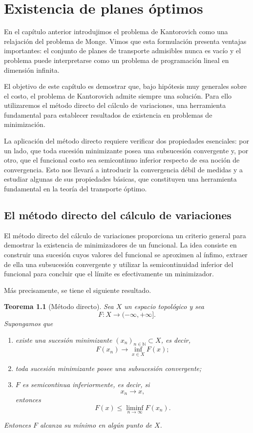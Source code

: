 \documentclass[12pt, a4paper]{amsbook}
\newtheorem{teo}{Teorema}[section]
\theoremstyle{remark}
\theoremstyle{definition}
\numberwithin{section}{chapter}
\numberwithin{subsection}{section}
\numberwithin{equation}{section}
\numberwithin{figure}{chapter}
\begin{document}
\chapter{Existencia de planes óptimos}\label{cap.existencia}

En el capítulo anterior introdujimos el problema de Kantorovich como una relajación del problema de Monge. Vimos que esta formulación presenta ventajas importantes: el conjunto de planes de transporte admisibles nunca es vacío y el problema puede interpretarse como un problema de programación lineal en dimensión infinita.

El objetivo de este capítulo es demostrar que, bajo hipótesis muy generales sobre el costo, el problema de Kantorovich admite siempre una solución. Para ello utilizaremos el método directo del cálculo de variaciones, una herramienta fundamental para establecer resultados de existencia en problemas de minimización.

La aplicación del método directo requiere verificar dos propiedades esenciales: por un lado, que toda sucesión minimizante posea una subsucesión convergente y, por otro, que el funcional costo sea semicontinuo inferior respecto de esa noción de convergencia. Esto nos llevará a introducir la convergencia débil de medidas y a estudiar algunas de sus propiedades básicas, que constituyen una herramienta fundamental en la teoría del transporte óptimo.


\section{El método directo del cálculo de variaciones}

El método directo del cálculo de variaciones proporciona un criterio general para demostrar la existencia de minimizadores de un funcional. La idea consiste en construir una sucesión cuyos valores del funcional se aproximen al ínfimo, extraer de ella una subsucesión convergente y utilizar la semicontinuidad inferior del funcional para concluir que el límite es efectivamente un minimizador.

Más precisamente, se tiene el siguiente resultado.

\begin{teo}[Método directo]
Sea \(X\) un espacio topológico y sea
\[
F\colon X\to(-\infty,+\infty].
\]
Supongamos que

\begin{enumerate}
    \item existe una sucesión minimizante \((x_n)_{n\in\mathbb N}\subset X\), es decir,
    \[
    F(x_n)\longrightarrow \inf_{x\in X}F(x);
    \]

    \item toda sucesión minimizante posee una subsucesión convergente;

    \item \(F\) es semicontinua inferiormente, es decir, si
    \[
    x_n\longrightarrow x,
    \]
    entonces
    \[
    F(x)\le\liminf_{n\to\infty}F(x_n).
    \]
\end{enumerate}

Entonces \(F\) alcanza su mínimo en algún punto de \(X\).
\end{teo}
\end{document}
